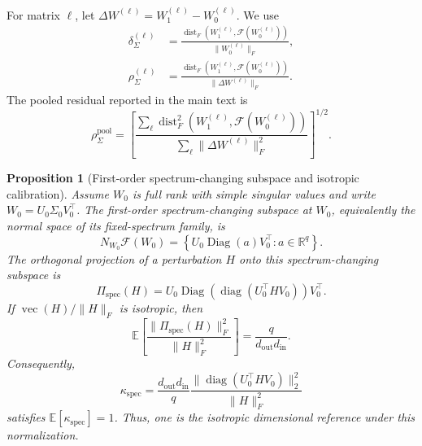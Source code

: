 \documentclass[11pt, a4paper]{utda}
\theoremstyle{plain}
\newtheorem{proposition}[theorem]{Proposition}
\theoremstyle{definition}
\theoremstyle{remark}
\begin{document}
For matrix $\ell$, let
$\Delta W^{(\ell)}=W_1^{(\ell)}-W_0^{(\ell)}$. We use
\begin{equation}
\begin{aligned}
\delta_{\Sigma}^{(\ell)}
&=
\frac{
    \operatorname{dist}_F
    \left(
        W_1^{(\ell)},
        \mathcal F(W_0^{(\ell)})
    \right)
}{
    \|W_0^{(\ell)}\|_F
},
\\
\rho_{\Sigma}^{(\ell)}
&=
\frac{
    \operatorname{dist}_F
    \left(
        W_1^{(\ell)},
        \mathcal F(W_0^{(\ell)})
    \right)
}{
    \|\Delta W^{(\ell)}\|_F
}.
\end{aligned}
\end{equation}
The pooled residual reported in the main text is
\begin{equation}
\label{eq:pooled_rho_sigma}
    \rho_{\Sigma}^{\mathrm{pool}}
    =
    \left[
        \frac{
            \sum_\ell
            \operatorname{dist}_F^2
            \left(
                W_1^{(\ell)},
                \mathcal F(W_0^{(\ell)})
            \right)
        }{
            \sum_\ell
            \|\Delta W^{(\ell)}\|_F^2
        }
    \right]^{1/2}.
\end{equation}

\begin{proposition}[First-order spectrum-changing subspace and isotropic calibration]
\label{prop:spectrum_changing_calibration}
Assume $W_0$ is full rank with simple singular values and write
$W_0=U_0\Sigma_0V_0^\top$. The first-order spectrum-changing subspace at
$W_0$, equivalently the normal space of its fixed-spectrum family, is
\begin{equation}
\label{eq:first_order_spectrum_changing_subspace}
    N_{W_0}\mathcal F(W_0)
    =
    \left\{
        U_0\operatorname{Diag}(a)V_0^\top:
        a\in\mathbb R^q
    \right\}.
\end{equation}
The orthogonal projection of a perturbation $H$ onto this spectrum-changing
subspace is
\begin{equation}
\label{eq:spectrum_changing_projection}
    \Pi_{\mathrm{spec}}(H)
    =
    U_0
    \operatorname{Diag}
    \left(
        \operatorname{diag}(U_0^\top H V_0)
    \right)
    V_0^\top.
\end{equation}
If $\operatorname{vec}(H)/\|H\|_F$ is isotropic, then
\begin{equation}
\label{eq:isotropic_dimension_fraction}
    \mathbb E
    \left[
        \frac{
            \|\Pi_{\mathrm{spec}}(H)\|_F^2
        }{
            \|H\|_F^2
        }
    \right]
    =
    \frac{
        q
    }{
        d_{\mathrm{out}}d_{\mathrm{in}}
    }.
\end{equation}
Consequently,
\begin{equation}
\label{eq:app_kappa_spec}
    \kappa_{\mathrm{spec}}
    =
    \frac{
        d_{\mathrm{out}}d_{\mathrm{in}}
    }{
        q
    }
    \frac{
        \|
            \operatorname{diag}
            (U_0^\top H V_0)
        \|_2^2
    }{
        \|H\|_F^2
    }
\end{equation}
satisfies $\mathbb E[\kappa_{\mathrm{spec}}]=1$. Thus, one is the isotropic
dimensional reference under this normalization.
\end{proposition}
\end{document}

